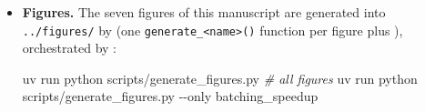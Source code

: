 \documentclass[
  english,
]{article}
\newenvironment{Shaded}{}{}
\newcommand{\AttributeTok}[1]{\textcolor[rgb]{0.49,0.56,0.16}{#1}}
\newcommand{\CommentTok}[1]{\textcolor[rgb]{0.38,0.63,0.69}{\textit{#1}}}
\newcommand{\ExtensionTok}[1]{#1}
\newcommand{\NormalTok}[1]{#1}
\begin{document}
\begin{itemize}
\item
  \textbf{Figures.} The seven figures of this manuscript are generated
  into \texttt{../figures/} by  (one
  \texttt{generate\_\textless{}name\textgreater{}()} function per figure
  plus ), orchestrated by
  :

\begin{Shaded}
\begin{Highlighting}[]
\ExtensionTok{uv}\NormalTok{ run python scripts/generate\_figures.py            }\CommentTok{\# all figures}
\ExtensionTok{uv}\NormalTok{ run python scripts/generate\_figures.py }\AttributeTok{{-}{-}only}\NormalTok{ batching\_speedup}
\end{Highlighting}
\end{Shaded}


\end{itemize}
\end{document}
